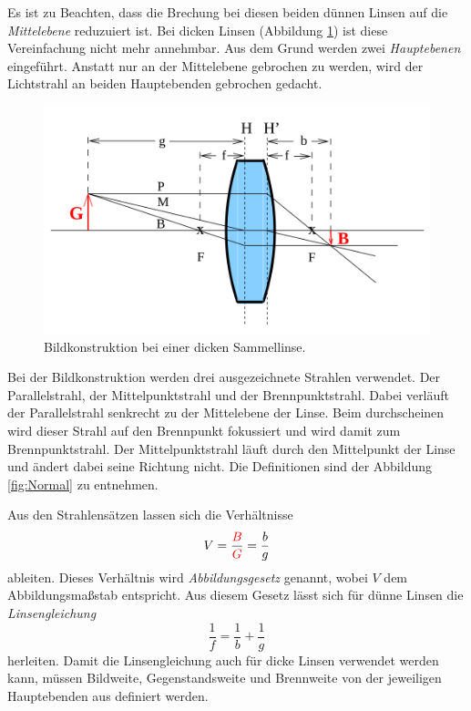 Es ist zu Beachten, dass die Brechung bei diesen beiden dünnen Linsen auf die \textit{Mittelebene} reduzuiert ist. Bei dicken Linsen (Abbildung \ref{fig:Dick}) ist diese Vereinfachung nicht mehr annehmbar. Aus dem Grund werden zwei \textit{Hauptebenen} eingeführt. Anstatt nur an der Mittelebene gebrochen zu werden, wird der Lichtstrahl an beiden Hauptebenden gebrochen gedacht.

\begin{figure}
    \includegraphics[width=\textwidth]{data/Breite_Linse.png}
    \caption{Bildkonstruktion bei einer dicken Sammellinse.}
    \label{fig:Dick}
\end{figure}

Bei der Bildkonstruktion werden drei ausgezeichnete Strahlen verwendet. Der Parallelstrahl, der Mittelpunktstrahl und der Brennpunktstrahl. Dabei verläuft der Parallelstrahl senkrecht zu der Mittelebene der Linse. Beim durchscheinen wird dieser Strahl auf den Brennpunkt fokussiert und wird damit zum Brennpunktstrahl. Der Mittelpunktstrahl läuft durch den Mittelpunkt der Linse und ändert dabei seine Richtung nicht. Die Definitionen sind der Abbildung \ref{fig:Normal} zu entnehmen. 

Aus den Strahlensätzen lassen sich die Verhältnisse 
\begin{equation}
    V=\frac{\textcolor{red}{B}}{\textcolor{red}{G}} = \frac{b}{g}
\end{equation}
ableiten. Dieses Verhältnis wird \textit{Abbildungsgesetz} genannt, wobei $V$ dem Abbildungsmaßstab entspricht. 
Aus diesem Gesetz lässt sich für dünne Linsen die \textit{Linsengleichung}
\begin{equation}
    \frac{1}{f}=\frac{1}{b}+\frac{1}{g}
\end{equation}
herleiten.
Damit die Linsengleichung auch für dicke Linsen verwendet werden kann, müssen Bildweite, Gegenstandsweite und Brennweite von der jeweiligen Hauptebenden aus definiert werden.


